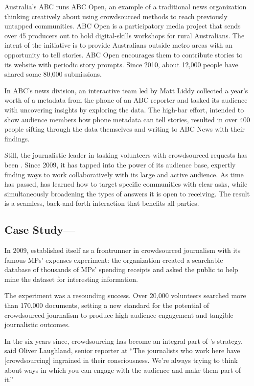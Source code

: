 \begin{itemize}
\begin{itemize}
\begin{enumerate}
{Australia’s ABC runs ABC Open,\autocite{ABCOpen} an example of a traditional news organization thinking creatively about using crowdsourced methods to reach previously untapped communities. ABC Open is a participatory media project that sends over 45 producers out to hold digital-skills workshops for rural Australians. The intent of the initiative is to provide Australians outside metro areas with an opportunity to tell stories. ABC Open encourages them to contribute stories to its website with periodic story prompts. Since 2010, about 12,000 people have shared some 80,000 submissions. 

In ABC’s news division, an interactive team led by Matt Liddy collected a year’s worth of a metadata from the phone of an ABC reporter and tasked its audience with uncovering insights by exploring the data.\autocite{Liddy} The high-bar effort, intended to show audience members how phone metadata can tell stories, resulted in over 400 people sifting through the data themselves and writing to ABC News with their findings.\autocite{ABCNews}

Still, the journalistic leader in tasking volunteers with crowdsourced requests has been . Since 2009, it has tapped into the power of its audience base, expertly finding ways to work collaboratively with its large and active audience. As time has passed,  has learned how to target specific communities with clear asks, while simultaneously broadening the types of answers it is open to receiving. The result is a seamless, back-and-forth interaction that benefits all parties. 

\subsection{Case Study---}

In 2009,  established itself as a frontrunner in crowdsourced journalism with its famous MPs’ expenses experiment: the organization created a searchable database of thousands of MPs’ spending receipts and asked the public to help mine the dataset for interesting information.

The experiment was a resounding success. Over 20,000 volunteers searched more than 170,000 documents, setting a new standard for the potential of crowdsourced journalism to produce high audience engagement and tangible journalistic outcomes. 

In the six years since, crowdsourcing has become an integral part of ’s strategy, said Oliver Laughland, senior reporter at \autocite{Laughland} “The journalists who work here have [crowdsourcing] ingrained in their consciousness. We’re always trying to think about ways in which you can engage with the audience and make them part of it.”

}
\end{enumerate}
\end{itemize}
\end{itemize}
